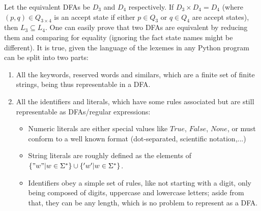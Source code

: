 \documentclass[docid=CA06]{tcom_CA}
\begin{document}
Let the equivalent DFAs be $D_3$ and $D_4$ respectively. If $D_3 \times D_4=D_4$ (where $(p,q)\in Q_{3 \times 4}$ is an accept state if either $p \in Q_3$ or $q \in Q_4$ are accept states), then $L_3 \subseteq L_4$. One can easily prove that two DFAs are equivalent by reducing them and comparing for equality (ignoring the fact state names might be different).
It is true, given the language of the lexemes in any Python program can be split into two parts:
\begin{enumerate}
	\item All the keywords, reserved words and similars, which are a finite set of finite strings, being thus representable in a DFA.
	\item All the identifiers and literals, which have some rules associated but are still representable as DFAs/regular expressions:
	\begin{itemize}
		\item Numeric literals are either special values like $True$, $False$, $None$, or must conform to a well known format (dot-separated, scientific notation,...)
		\item String literals are roughly defined as the elements of $\{"w" | w \in \Sigma^* \} \cup \{'w' | w \in \Sigma^* \}$.
		\item Identifiers obey a simple set of rules, like not starting with a digit, only being composed of digits, uppercase and lowercase letters; aside from that, they can be any length, which is no problem to represent as a DFA.
	\end{itemize}
\end{enumerate}
\end{document}
